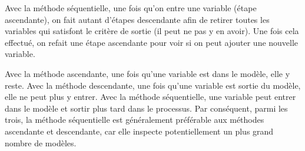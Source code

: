 \documentclass[
  11pt,
  letterpaper,
]{scrbook}
\theoremstyle{definition}
\theoremstyle{remark}
\begin{document}
Avec la méthode séquentielle, une fois qu'on entre une variable (étape
ascendante), on fait autant d'étapes descendante afin de retirer toutes
les variables qui satisfont le critère de sortie (il peut ne pas y en
avoir). Une fois cela effectué, on refait une étape ascendante pour voir
si on peut ajouter une nouvelle variable.

Avec la méthode ascendante, une fois qu'une variable est dans le modèle,
elle y reste. Avec la méthode descendante, une fois qu'une variable est
sortie du modèle, elle ne peut plus y entrer. Avec la méthode
séquentielle, une variable peut entrer dans le modèle et sortir plus
tard dans le processus. Par conséquent, parmi les trois, la méthode
séquentielle est généralement préférable aux méthodes ascendante et
descendante, car elle inspecte potentiellement un plus grand nombre de
modèles.
\end{document}
